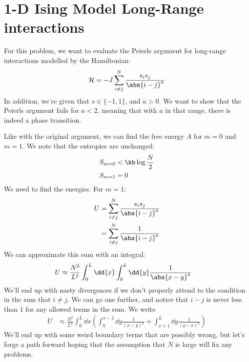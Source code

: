 \documentclass[../../PS3.tex]{subfiles}
\begin{document}
\section{1-D Ising Model Long-Range interactions}

For this problem, we want to evaluate the Peierls argument for long-range interactions modelled by the Hamiltonian:
\begin{equation}
	\ham = -J \sum_{i\neq j}^N \frac{s_i s_j }{\abs{i-j}^a}
\end{equation}
In addition, we're given that $s \in \{-1, 1\}$, and $a > 0$. We want to show that the Peierls argument fails for $a < 2$, meaning that with $a$ in that range, there is indeed a phase transition. 

Like with the original argument, we can find the free energy $A$ for $m = 0$ and $m = 1$. We note that the entropies are unchanged: 
\begin{align}
	S_{m = 0} &< \kb \log \frac{N}{2} \\
	S_{m = 1} &= 0
\end{align}
We need to find the energies. For $m = 1$:
\begin{align}
	U &=  \sum_{i\neq j}^N \frac{s_i s_j }{\abs{i-j}^a} \\
	&= \sum_{i\neq j}^N \frac{1}{\abs{i-j}^a} \\
\end{align}
We can approximate this sum with an integral:
\begin{align}
	U &\approx \frac{N^2}{L^2} \int_0^{L} \dd{x} \int_0^{L} \dd{y} \frac{1}{\abs{x - y}^a} 
\end{align}
We'll end up with nasty divergences if we don't properly attend to the condition in the sum that $i \neq j$. We can go one further, and notice that $i - j$ is never less than $1$ for any allowed terms in the sum. We write
\begin{align}
	U &\approx \frac{N^2}{L^2} \int_0^{L} \dd{x} \left( \int_{0}^{x - 1} \dd{y} \frac{1}{(x - y)^a} +  \int_{x + 1}^{L} \dd{y} \frac{1}{(y - x)^a} \right)
\end{align}
We'll end up with some weird boundary terms that are possibly wrong, but let's forge a path forward hoping that the assumption that $N$ is large will fix any problems.
\end{document}
